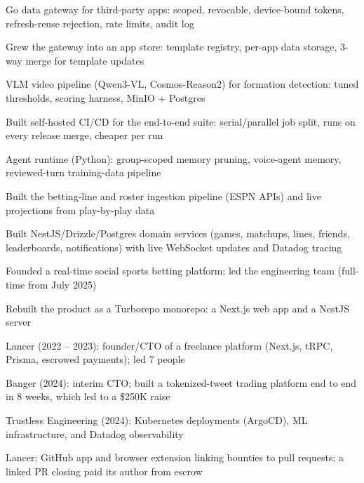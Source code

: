 \documentclass[print]{jack-resume}
\begin{document}
\begin{tightemize}
    \item Go data gateway for third-party apps: scoped, revocable, device-bound tokens, refresh-reuse rejection, rate limits, audit log
    \item Grew the gateway into an app store: template registry, per-app data storage, 3-way merge for template updates
    \item VLM video pipeline (Qwen3-VL, Cosmos-Reason2) for formation detection: tuned thresholds, scoring harness, MinIO + Postgres
    \item Built self-hosted CI/CD for the end-to-end suite: serial/parallel job split, runs on every release merge, cheaper per run
    \item Agent runtime (Python): group-scoped memory pruning, voice-agent memory, reviewed-turn training-data pipeline
\end{tightemize}
\sectionsep

\begin{tightemize}
    \item Built the betting-line and roster ingestion pipeline (ESPN APIs) and live projections from play-by-play data
    \item Built NestJS/Drizzle/Postgres domain services (games, matchups, lines, friends, leaderboards, notifications) with live WebSocket updates and Datadog tracing
    \item Founded a real-time social sports betting platform; led the engineering team (full-time from July 2025)
    \item Rebuilt the product as a Turborepo monorepo: a Next.js web app and a NestJS server
\end{tightemize}
\sectionsep

\begin{tightemize}
    \item Lancer (2022 -- 2023): founder/CTO of a freelance platform (Next.js, tRPC, Prisma, escrowed payments); led 7 people
    \item Banger (2024): interim CTO; built a tokenized-tweet trading platform end to end in 8 weeks, which led to a \$250K raise
    \item Trustless Engineering (2024): Kubernetes deployments (ArgoCD), ML infrastructure, and Datadog observability
    \item Lancer: GitHub app and browser extension linking bounties to pull requests; a linked PR closing paid its author from escrow
\end{tightemize}
\sectionsep
\end{document}
